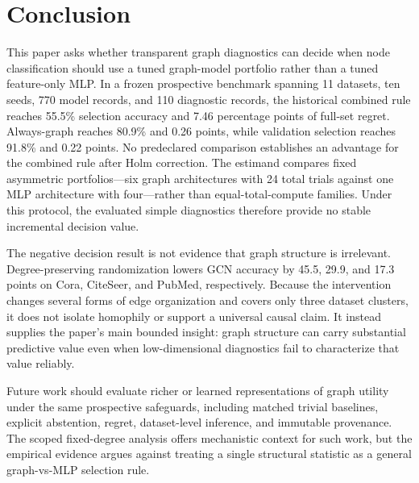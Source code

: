 \section{Conclusion}
\label{sec:conclusion}

This paper asks whether transparent graph diagnostics can decide when node classification should use a tuned graph-model portfolio rather than a tuned feature-only MLP. In a frozen prospective benchmark spanning 11 datasets, ten seeds, 770 model records, and 110 diagnostic records, the historical combined rule reaches 55.5\% selection accuracy and 7.46 percentage points of full-set regret. Always-graph reaches 80.9\% and 0.26 points, while validation selection reaches 91.8\% and 0.22 points. No predeclared comparison establishes an advantage for the combined rule after Holm correction. The estimand compares fixed asymmetric portfolios---six graph architectures with 24 total trials against one MLP architecture with four---rather than equal-total-compute families. Under this protocol, the evaluated simple diagnostics therefore provide no stable incremental decision value.

The negative decision result is not evidence that graph structure is irrelevant. Degree-preserving randomization lowers GCN accuracy by 45.5, 29.9, and 17.3 points on Cora, CiteSeer, and PubMed, respectively. Because the intervention changes several forms of edge organization and covers only three dataset clusters, it does not isolate homophily or support a universal causal claim. It instead supplies the paper's main bounded insight: graph structure can carry substantial predictive value even when low-dimensional diagnostics fail to characterize that value reliably.

Future work should evaluate richer or learned representations of graph utility under the same prospective safeguards, including matched trivial baselines, explicit abstention, regret, dataset-level inference, and immutable provenance. The scoped fixed-degree analysis offers mechanistic context for such work, but the empirical evidence argues against treating a single structural statistic as a general graph-vs-MLP selection rule.
